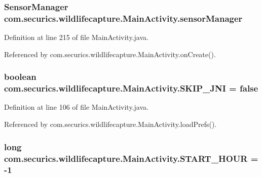 \subsubsection[{sensor\+Manager}]{\setlength{\rightskip}{0pt plus 5cm}Sensor\+Manager com.\+securics.\+wildlifecapture.\+Main\+Activity.\+sensor\+Manager\hspace{0.3cm}{\ttfamily [static]}}\label{classcom_1_1securics_1_1wildlifecapture_1_1_main_activity_a27701a212f9e06ba41fe0bb9e4201b3c}


Definition at line 215 of file Main\+Activity.\+java.



Referenced by com.\+securics.\+wildlifecapture.\+Main\+Activity.\+on\+Create().

\subsubsection[{S\+K\+I\+P\+\_\+\+J\+N\+I}]{\setlength{\rightskip}{0pt plus 5cm}boolean com.\+securics.\+wildlifecapture.\+Main\+Activity.\+S\+K\+I\+P\+\_\+\+J\+N\+I = false\hspace{0.3cm}{\ttfamily [private]}}\label{classcom_1_1securics_1_1wildlifecapture_1_1_main_activity_a2b8351d2d4449ae7f540395eda2a411b}


Definition at line 106 of file Main\+Activity.\+java.



Referenced by com.\+securics.\+wildlifecapture.\+Main\+Activity.\+load\+Prefs().

\subsubsection[{S\+T\+A\+R\+T\+\_\+\+H\+O\+U\+R}]{\setlength{\rightskip}{0pt plus 5cm}long com.\+securics.\+wildlifecapture.\+Main\+Activity.\+S\+T\+A\+R\+T\+\_\+\+H\+O\+U\+R = -\/1\hspace{0.3cm}{\ttfamily [private]}}\label{classcom_1_1securics_1_1wildlifecapture_1_1_main_activity_a440051ecd9043efbef97c5328ded0155}


